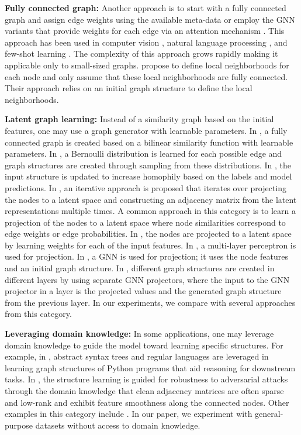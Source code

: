 \documentclass{article}
\begin{document}
\textbf{Fully connected graph:}
Another approach is to start with a fully connected graph and assign edge weights using the available meta-data or employ the GNN variants that provide weights for each edge via an attention mechanism \citep{velivckovic2018graph,zhang2018gaan}. This approach has been used in computer vision \citep[e.g.,][]{suhail2019mixture}, natural language processing \citep[e.g.,][]{zhu2019graph}, and few-shot learning \citep[e.g.,][]{garcia2017few}. The complexity of this approach grows rapidly making it applicable only to small-sized graphs. \citet{zhang2020graph} propose to define local neighborhoods for each node and only assume that these local neighborhoods are fully connected. Their approach relies on an initial graph structure to define the local neighborhoods.

\textbf{Latent graph learning:}
Instead of a similarity graph based on the initial features, one may use a graph generator with learnable parameters. In \cite{li2018adaptive}, a fully connected graph is created based on a bilinear similarity function with learnable parameters. In \cite{franceschi2019learning}, a Bernoulli distribution is learned for each possible edge and graph structures are created through sampling from these distributions. In \cite{yang2019topology}, the input structure is updated to increase homophily based on the labels and model predictions. In \cite{IDGL}, an iterative approach is proposed that iterates over projecting the nodes to a latent space and constructing an adjacency matrix from the latent representations multiple times.
A common approach in this category is to learn a projection of the nodes to a latent space where node similarities correspond to edge weights or edge probabilities. In
\cite{wu2018quest}, the nodes are projected to a latent space by learning weights for each of the input features. In \cite{qasim2019learning,jiang2019semi,cosmo2020latent}, a multi-layer perceptron is used for projection. In \cite{GRCN,zhao2020data}, a GNN is used for projection; it uses the node features and an initial graph structure. In \cite{kazi2020differentiable}, different graph structures are created in different layers by using separate GNN projectors, where the input to the GNN projector in a layer is the projected values and the generated graph structure from the previous layer. 
In our experiments, we compare with several approaches from this category.

\textbf{Leveraging domain knowledge:}
In some applications, one may leverage domain knowledge to guide the model toward learning specific structures. For example, in \cite{johnson2020learning}, abstract syntax trees and regular languages are leveraged in learning graph structures of Python programs that aid reasoning for downstream tasks. In \cite{jin2020graph}, the structure learning is guided for robustness to adversarial attacks through the domain knowledge that clean adjacency matrices are often sparse and low-rank and exhibit feature smoothness along the connected nodes.
Other examples in this category include \cite{jang2019brain,qasim2019learning}. In our paper, we experiment with general-purpose datasets without access to domain knowledge.
\end{document}
